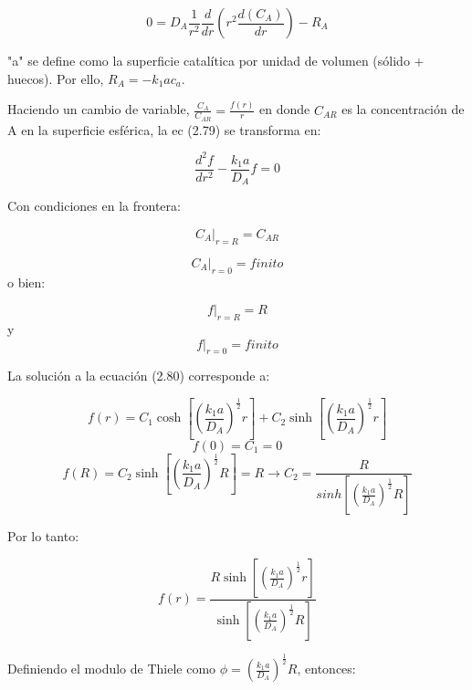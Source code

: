 \begin{equation}
    0=D_A\frac{1}{r^2}\frac{d}{dr}(r^2\frac{d(C_A)}{dr})-R_A
\end{equation}

"a" se define como la superficie catalítica por unidad de volumen (sólido + huecos). Por ello, $R_A=-k_1ac_a$.

Haciendo un cambio de variable, $\frac{C_A}{C_{AR}}=\frac{f(r)}{r}$ en donde $C_{AR}$ es la concentración de A en la superficie esférica, la ec (2.79) se transforma en:

\begin{equation}
    \frac{d^2f}{dr^2}-\frac{k_1a}{D_A}f=0
\end{equation}

Con condiciones en la frontera:

\begin{equation*}
    C_A|_{r=R}=C_{AR}
\end{equation*}

\begin{equation}
    C_A|_{r=0}=finito
\end{equation}
o bien:

\begin{equation*}
    f|_{r=R}=R
\end{equation*}
y \begin{equation*}
    f|_{r=0}=finito
\end{equation*}

La solución a la ecuación (2.80) corresponde a:

\begin{equation}
    f(r)=C_1\cosh[(\frac{k_1a}{D_A})^\frac{1}{2}r]+C_2\sinh[(\frac{k_1a}{D_A})^\frac{1}{2}r]
\end{equation}
\begin{equation*}
    f(0)=C_1=0
\end{equation*}
\begin{equation*}
    f(R)=C_2\sinh[(\frac{k_1a}{D_A})^\frac{1}{2}R]=R\longrightarrow C_2=\frac{R}{sinh[(\frac{k_1a}{D_A})^\frac{1}{2}R]}
\end{equation*}

Por lo tanto:

\begin{equation}
    f(r)=\frac{R\sinh[(\frac{k_1a}{D_A})^\frac{1}{2}r]}{\sinh[(\frac{k_1a}{D_A})^\frac{1}{2}R]}
\end{equation}

Definiendo el modulo de Thiele como $\phi=(\frac{k_1a}{D_A})^\frac{1}{2}R$, entonces:

